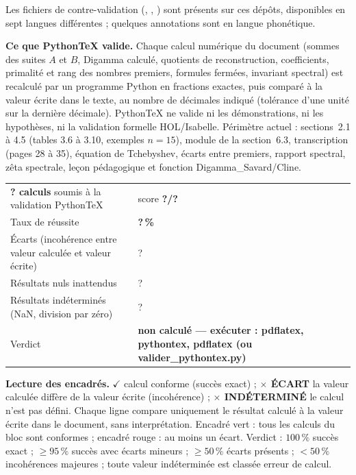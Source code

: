 \documentclass[11pt,a4paper]{article}
\newcommand{\vtotal}{?}\newcommand{\vconf}{?}\newcommand{\vtaux}{?}
\newcommand{\vecart}{?}\newcommand{\vnul}{?}\newcommand{\vnan}{?}
\newcommand{\vverdict}{non calculé --- exécuter : pdflatex, pythontex, pdflatex (ou valider\_pythontex.py)}
\begin{document}
Les fichiers de contre-validation (,
, ) sont
présents sur ces dépôts, disponibles en sept langues différentes ; quelques
annotations sont en langue phonétique.

\begin{tcolorbox}[enhanced,colback=spectralgris,colframe=spectralbleu,
  title={Légende --- PythonTeX : calculs numériques du document \emph{Le-système-convolutif-Gabriel.pdf}},
  fonttitle=\bfseries\small,fontupper=\small,arc=2mm,boxrule=0.8pt,left=2mm,right=2mm,
  before skip=10pt,after skip=10pt]
\textbf{Ce que PythonTeX valide.} Chaque calcul numérique du document (sommes des suites $A$ et $B$,
Digamma calculé, quotients de reconstruction, coefficients, primalité et rang des nombres premiers,
formules fermées, invariant spectral) est recalculé par un programme Python en fractions exactes, puis
comparé à la valeur écrite dans le texte, au nombre de décimales indiqué (tolérance d'une unité sur la dernière décimale). PythonTeX ne valide ni les
démonstrations, ni les hypothèses, ni la validation formelle HOL/Isabelle. Périmètre actuel : sections~2.1 à 4.5
(tables 3.6 à 3.10, exemples $n=15$), module de la section~6.3, transcription (pages 28 à 35), équation de Tchebyshev,
écarts entre premiers, rapport spectral, zêta spectrale, leçon pédagogique et fonction Digamma\_Savard/Cline.

\smallskip
\begin{center}
\renewcommand{\arraystretch}{1.25}
\begin{tabular}{@{}ll@{}}
\toprule
\rowcolor{white}
\textbf{\vtotal{} calculs} soumis à la validation PythonTeX & score \textbf{\vconf/\vtotal} \\
Taux de réussite & \textbf{\vtaux\,\%} \\
Écarts (incohérence entre valeur calculée et valeur écrite) & \vecart \\
Résultats nuls inattendus & \vnul \\
Résultats indéterminés (NaN, division par zéro) & \vnan \\
Verdict & \textbf{\vverdict} \\
\bottomrule
\end{tabular}
\end{center}

\textbf{Lecture des encadrés.} \textcolor{vertpy}{\textbf{$\checkmark$}} calcul conforme (succès exact) ;
\textcolor{spectralrouge}{\textbf{$\times$ \'ECART}} la valeur calculée diffère de la valeur écrite (incohérence) ;
\textcolor{spectralrouge}{\textbf{$\times$ IND\'ETERMIN\'E}} le calcul n'est pas défini. Chaque ligne compare uniquement le résultat calculé à la valeur écrite dans le document, sans interprétation.
Encadré vert : tous les calculs du bloc sont conformes ;
encadré rouge : au moins un écart. Verdict : $100\,\%$ succès exact ; $\ge 95\,\%$ succès avec écarts mineurs ;
$\ge 50\,\%$ écarts présents ; $<50\,\%$ incohérences majeures ; toute valeur indéterminée est classée erreur de calcul.
\end{tcolorbox}
\end{document}
